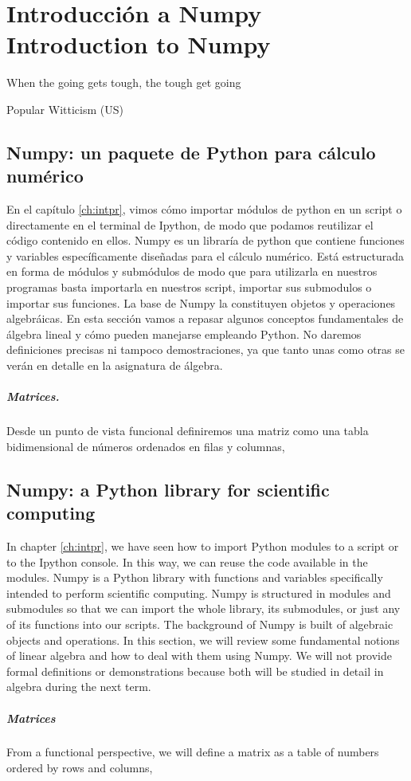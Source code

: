 \chapter{Introducción a Numpy\\ Introduction to Numpy} \label{ch:numpy}
\epigraph{When the going gets tough, the tough get going}{Popular Witticism (US)}
\begin{paracol}{2}
\section{Numpy: un paquete de Python para cálculo nu\-mérico}
En el capítulo \ref{ch:intpr}, vimos cómo importar mó\-dulos de python en un script o directamente en el terminal de Ipython, de modo que podamos reutilizar el código contenido en ellos. Numpy es un libraría de python que contiene funciones y variables específicamente diseñadas para el cálculo numérico. Está estructurada en forma de módulos y submódulos de modo que para utilizarla en nuestros programas basta  importarla en nuestros script, importar sus submodulos o importar sus funciones.
La base de Numpy la constituyen objetos y operaciones algebráicas. En esta sección vamos a repasar algunos conceptos fundamentales de  álgebra lineal y cómo pueden manejarse empleando Python. No daremos definiciones precisas ni tampoco demostraciones, ya que tanto unas como otras se verán en detalle en la asignatura de álgebra.

\paragraph{Matrices.} Desde un punto de vista funcional definiremos una matriz como una tabla bidimensional de números ordenados en filas y columnas,
\switchcolumn

\section{Numpy: a Python library for scientific computing}
In chapter \ref{ch:intpr}, we have seen how to import Python modules to a script or to the Ipython console. In this way, we can reuse the code available in the modules. Numpy is a Python library with functions and variables specifically intended to perform scientific computing. Numpy is structured in modules and submodules so that we can import the whole library, its submodules, or just any of its functions into our scripts. The background of Numpy is built of algebraic objects and operations. In this section, we will review some fundamental notions of linear algebra and how to deal with them using Numpy. We will not provide formal definitions or demonstrations because both will be studied in detail in algebra during the next term.
\paragraph{Matrices} From a functional perspective, we will define a matrix as a table of numbers ordered by rows and columns,
\end{paracol}

